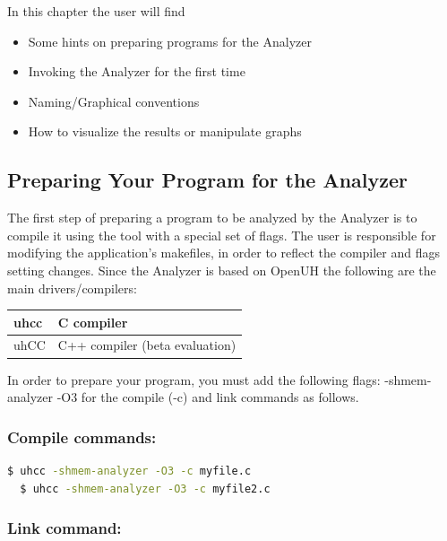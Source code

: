 In this chapter the user will find

\begin{itemize}
\item Some hints on preparing programs for the \openshmem Analyzer
\item Invoking the \openshmem Analyzer for the first time
\item Naming/Graphical conventions
\item How to visualize the results or manipulate graphs
\end{itemize}

\subsection{Preparing Your Program for the \openshmem Analyzer}

The first step of preparing a program to be analyzed by the \openshmem
Analyzer is to compile it using the tool with a special set of
flags. The user is responsible for modifying the application's
makefiles, in order to reflect the compiler and flags setting
changes. Since the \openshmem Analyzer is based on OpenUH the
following are the main drivers/compilers:

\vspace{0.1in}

\begin{center}
  \begin{tabular}{|l | l |}
    \hline
    uhcc & C compiler \\
    \hline
    uhCC & C++ compiler (beta evaluation) \\
    \hline
  \end{tabular}
\end{center}

\vspace{0.1in}

In order to prepare your program, you must add the following flags:
-shmem-analyzer -O3 for the compile (-c) and link commands as follows.

\subsubsection*{Compile commands:}

\begin{lstlisting}[language=bash]
  $ uhcc -shmem-analyzer -O3 -c myfile.c
  $ uhcc -shmem-analyzer -O3 -c myfile2.c
\end{lstlisting}

\subsubsection*{Link command:}

